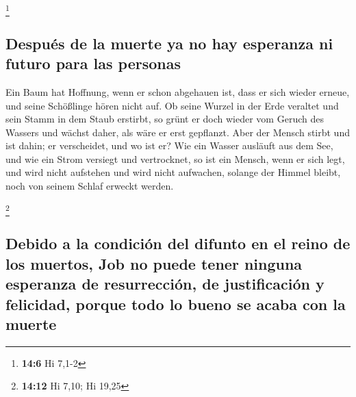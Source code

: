 \footnote{\textbf{14:6} Hi 7,1-2}

\hypertarget{despuuxe9s-de-la-muerte-ya-no-hay-esperanza-ni-futuro-para-las-personas}{%
\subsection{Después de la muerte ya no hay esperanza ni futuro para las
personas}\label{despuuxe9s-de-la-muerte-ya-no-hay-esperanza-ni-futuro-para-las-personas}}

 Ein Baum hat Hoffnung, wenn er schon abgehauen ist, dass
er sich wieder erneue, und seine Schößlinge hören nicht auf.
 Ob seine Wurzel in der Erde veraltet und sein Stamm in
dem Staub erstirbt,  so grünt er doch wieder vom Geruch
des Wassers und wächst daher, als wäre er erst gepflanzt.
 Aber der Mensch stirbt und ist dahin; er verscheidet,
und wo ist er?  Wie ein Wasser ausläuft aus dem See, und
wie ein Strom versiegt und vertrocknet,  so ist ein
Mensch, wenn er sich legt, und wird nicht aufstehen und wird nicht
aufwachen, solange der Himmel bleibt, noch von seinem Schlaf erweckt
werden.

\footnote{\textbf{14:12} Hi 7,10; Hi 19,25}

\hypertarget{debido-a-la-condiciuxf3n-del-difunto-en-el-reino-de-los-muertos-job-no-puede-tener-ninguna-esperanza-de-resurrecciuxf3n-de-justificaciuxf3n-y-felicidad-porque-todo-lo-bueno-se-acaba-con-la-muerte}{%
\subsection{Debido a la condición del difunto en el reino de los
muertos, Job no puede tener ninguna esperanza de resurrección, de
justificación y felicidad, porque todo lo bueno se acaba con la
muerte}\label{debido-a-la-condiciuxf3n-del-difunto-en-el-reino-de-los-muertos-job-no-puede-tener-ninguna-esperanza-de-resurrecciuxf3n-de-justificaciuxf3n-y-felicidad-porque-todo-lo-bueno-se-acaba-con-la-muerte}}

